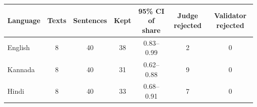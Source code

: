 \renewcommand{\arraystretch}{1.25}
\footnotesize
\begin{tabular}{|l|c|c|c|c|c|c|}
\hline
\textbf{Language} & \textbf{Texts} & \textbf{Sentences} & \textbf{Kept} & \textbf{95\% CI of share} & \textbf{Judge rejected} & \textbf{Validator rejected} \\
\hline
English & 8 & 40 & 38 & 0.83--0.99 & 2 & 0 \\
\hline
Kannada & 8 & 40 & 31 & 0.62--0.88 & 9 & 0 \\
\hline
Hindi & 8 & 40 & 33 & 0.68--0.91 & 7 & 0 \\
\hline
\end{tabular}
